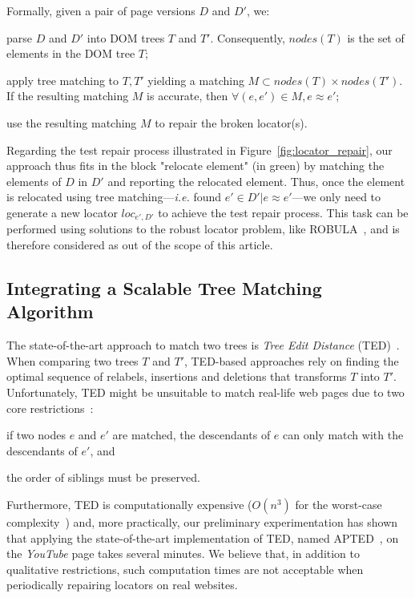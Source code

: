 \documentclass[preprint, 12pt]{elsarticle}
\begin{document}
Formally, given a pair of page versions $D$ and $D'$, we:
\begin{compactenum}
    \item parse $D$ and $D'$ into DOM trees $T$ and $T'$.
    Consequently, $nodes(T)$ is the set of elements in the DOM tree $T$;
    \item apply tree matching to $T, T'$ yielding a matching $M \subset nodes(T) \times nodes(T')$.
    If the resulting matching $M$ is accurate, then $\forall (e, e') \in M, e \approx e'$;
    \item use the resulting matching $M$ to repair the broken locator(s).
\end{compactenum}

Regarding the test repair process illustrated in Figure~\ref{fig:locator_repair}, our approach thus fits in the block "\textsf{relocate element}" (in green) by matching the elements of $D$ in $D'$ and reporting the relocated element. 
Thus, once the element is relocated using tree matching---\emph{i.e.} \erratum found $e' \in D'|e \approx e'$---we only need to generate a new locator $loc_{e', D'}$ to achieve the test repair process.
This task can be performed using solutions to the robust locator problem, like ROBULA~\cite{leotta2014reducing}, and is therefore considered as out of the scope of this article.

\subsection{Integrating a Scalable Tree Matching Algorithm}
The state-of-the-art approach to match two trees is \emph{Tree Edit Distance} (TED)~\cite{tai1979tree}. 
When comparing two trees $T$ and $T'$, TED-based approaches rely on finding the optimal sequence of relabels, insertions and deletions that transforms $T$ into $T'$.
Unfortunately, TED might be unsuitable to match real-life web pages due to two core restrictions~\cite{Kumar2011_FTM}:
\begin{inparaenum}
    \item if two nodes $e$ and $e'$ are matched, the descendants of $e$ can only match with the descendants of $e'$, and
    \item the order of siblings must be preserved.
\end{inparaenum}
Furthermore, TED is computationally expensive ($O(n^3)$ for the worst-case complexity~\cite{bringmann2018tree}) and, more practically, our preliminary experimentation has shown that applying the state-of-the-art implementation of TED, named APTED~\cite{pawlik2016tree}, on the \textit{YouTube} page takes several minutes. 
We believe that, in addition to qualitative restrictions, such computation times are not acceptable when periodically repairing locators on real websites.
\end{document}
